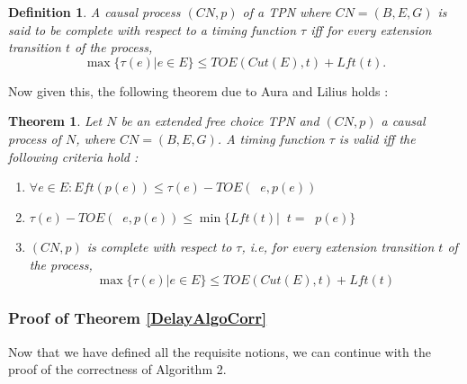 \documentclass[conference]{IEEEtran}
\DeclareMathOperator*{\pre}{^\bullet}
\newtheorem{theorem}{Theorem}
\newtheorem{definition}{Definition}
\begin{document}
	\begin{definition} A causal process $(CN, p)$ of a TPN where $CN = (B, E, G)$ is said to be \textit{complete} with respect to a timing function $\tau$ iff for every extension transition $t$ of the process, $$\max\{\tau(e)| e \in E\} \leq TOE(Cut(E), t) + Lft(t).$$
	\end{definition}
	
	Now given this, the following theorem due to Aura and Lilius \cite{AL97} holds : 
	
	\begin{theorem}\label{thm35}
		Let $N$ be an extended free choice TPN and $(CN, p)$ a causal process of $N$, where $CN = (B, E, G)$. A timing function $\tau$ is valid iff the following criteria hold : 
		
		\begin{enumerate}
			\item$ \forall e \in E :  Eft(p(e)) \leq \tau(e) - TOE(\pre e, p(e))$
			\item $\tau(e) - TOE(\pre e, p(e)) \leq  \min \{Lft(t) | \pre t = \pre p(e)\}$
			\item $(CN, p)$ is complete with respect to $\tau$, i.e, for every extension transition $t$ of the process, $$\max\{\tau(e)| e \in E\} \leq TOE(Cut(E), t) + Lft(t)$$
			
		\end{enumerate}
	\end{theorem}
	

	\subsubsection{Proof of Theorem \ref{DelayAlgoCorr}}

	Now that we have defined all the requisite notions, we can continue with the proof of the correctness of Algorithm 2. 
	
\end{document}
